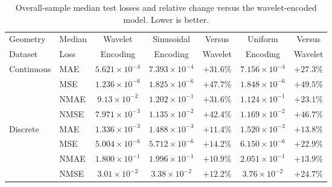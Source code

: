 \documentclass[preprint,review,12pt,numafflabel]{elsarticle}
\begin{document}
\begin{table}[H]
    \centering
    \small
    \begin{tabular}{llccccc}
        \toprule
        Geometry & Median & Wavelet & Sinusoidal & Versus & Uniform & Versus \\
        Dataset & Loss & Encoding & Encoding & Wavelet & Encoding & Wavelet \\
        \midrule
        \multirow{4}{*}{Continuous}
            & MAE  & $5.621\times10^{-4}$ & $7.393\times10^{-4}$ & $+31.6\%$ & $7.156\times10^{-4}$ & $+27.3\%$ \\
            & MSE  & $1.236\times10^{-6}$ & $1.825\times10^{-6}$ & $+47.7\%$ & $1.848\times10^{-6}$ & $+49.5\%$ \\
            & NMAE & $9.13\times10^{-2}$  & $1.202\times10^{-1}$ & $+31.6\%$ & $1.124\times10^{-1}$ & $+23.1\%$ \\
            & NMSE & $7.971\times10^{-3}$ & $1.135\times10^{-2}$ & $+42.4\%$ & $1.169\times10^{-2}$ & $+46.7\%$ \\
        \midrule
        \multirow{4}{*}{Discrete}
            & MAE  & $1.336\times10^{-3}$ & $1.488\times10^{-3}$ & $+11.4\%$ & $1.520\times10^{-3}$ & $+13.8\%$ \\
            & MSE  & $5.004\times10^{-6}$ & $5.712\times10^{-6}$ & $+14.2\%$ & $6.150\times10^{-6}$ & $+22.9\%$ \\
            & NMAE & $1.800\times10^{-1}$ & $1.996\times10^{-1}$ & $+10.9\%$ & $2.051\times10^{-1}$ & $+13.9\%$ \\
            & NMSE & $3.01\times10^{-2}$  & $3.38\times10^{-2}$  & $+12.2\%$ & $3.76\times10^{-2}$  & $+24.7\%$ \\
        \bottomrule
    \end{tabular}
    \caption{Overall-sample median test losses and relative change versus the wavelet-encoded model. Lower is better.}
    \label{tab:encoding_ablation_median}
\end{table}
\end{document}
